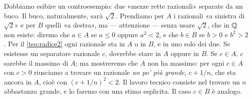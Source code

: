 \begin{strategia}
Dobbiamo esibire un controesempio: due «mezze rette razionali» separate da un buco.
Il buco, naturalmente, sarà $\sqrt2$. Prendiamo per $A$ i razionali «a sinistra di
$\sqrt2$» e per $B$ quelli «a destra», ma --- attenzione --- senza usare $\sqrt2$, che
in $\mathbb{Q}$ non esiste: diremo che $a\in A$ se $a\le0$ oppure $a^{2}<2$, e che $b\in B$ se
$b>0$ e $b^{2}>2$. Per il \cref{teo:radice2} ogni razionale sta in $A$ o in $B$, e in
uno solo dei due. Se esistesse un separatore razionale $c$, dovrebbe stare in $A$
oppure in $B$. Se $c\in A$, $c$ sarebbe il massimo di $A$; ma mostreremo che $A$ non
ha massimo: per ogni $c\in A$ con $c>0$ riusciamo a trovare un razionale \emph{un po'
più grande}, $c+1/n$, che sta ancora in $A$, cioè con $(c+1/n)^{2}<2$. Il lavoro
tecnico consiste nel trovare un $n$ abbastanza grande, e lo faremo con una stima
esplicita. Il caso $c\in B$ è analogo.
\end{strategia}

